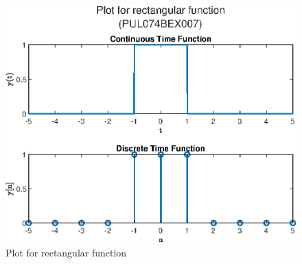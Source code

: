 \documentclass{lab_sheet}
\begin{document}
\begin{figure}[H]
    \centering
    \includegraphics[width=0.85\linewidth]{../Figures/rectangular.eps}
    \caption{Plot for rectangular function}
    \label{fig:2_1_d}
\end{figure}
\end{document}
